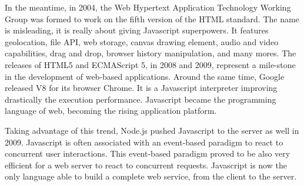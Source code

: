 In the meantime, in 2004, the Web Hypertext Application Technology Working Group was formed to work on the fifth version of the HTML standard.
The name is misleading, it is really about giving Javascript superpowers.
It features geolocation, file API, web storage, canvas drawing element, audio and video capabilities, drag and drop, browser history manipulation, and many mores.
The releases of HTML5 and ECMAScript 5, in 2008 and 2009, represent a mile-stone in the development of web-based applications.
Around the same time, Google released V8 for its browser Chrome.
It is a Javascript interpreter improving drastically the execution performance. %
Javascript became the programming language of web, becoming the rising application platform.


Taking advantage of this trend, Node.js pushed Javascript to the server as well in 2009.
Javascript is often associated with an event-based paradigm to react to concurrent user interactions.
This event-based paradigm proved to be also very efficient for a web server to react to concurrent requests.
Javascript is now the only language able to build a complete web service, from the client to the server.


